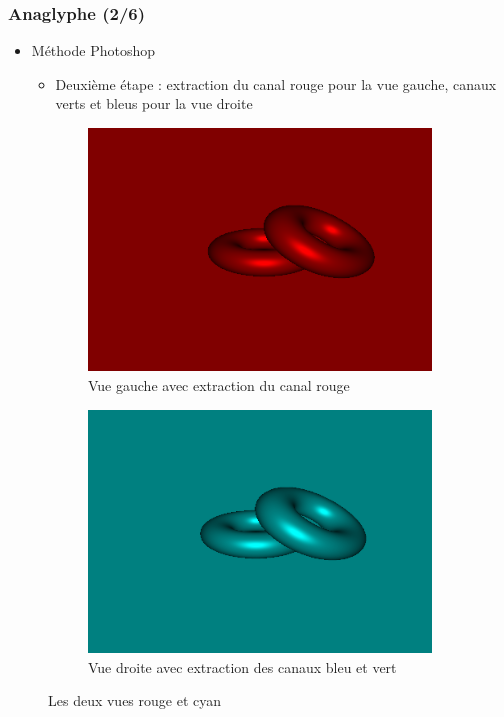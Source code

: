 \documentclass{beamer}
\begin{document}
\begin{frame}
\frametitle{Anaglyphe (2/6)}
\begin{itemize}[label=$\bullet$]
\item Méthode Photoshop \cite{stereoAnaglyph}
	\begin{itemize}[label=$\circ$]
	\item Deuxième étape : extraction du canal rouge pour la vue gauche, canaux verts et bleus pour la vue droite 
	\end{itemize}
\end{itemize}
\begin{figure}
\centering
\begin{subfigure}{.5\textwidth}
  \centering
  \includegraphics[width=.8\linewidth]{gauche_rouge.png}
  \caption{Vue gauche avec extraction du canal rouge}
\end{subfigure}%
\begin{subfigure}{.5\textwidth}
  \centering
  \includegraphics[width=.8\linewidth]{droite_cyan.png}
  \caption{Vue droite avec extraction des canaux bleu et vert}
\end{subfigure}
\caption{Les deux vues rouge et cyan}
\end{figure}


	\end{frame}
\end{document}
